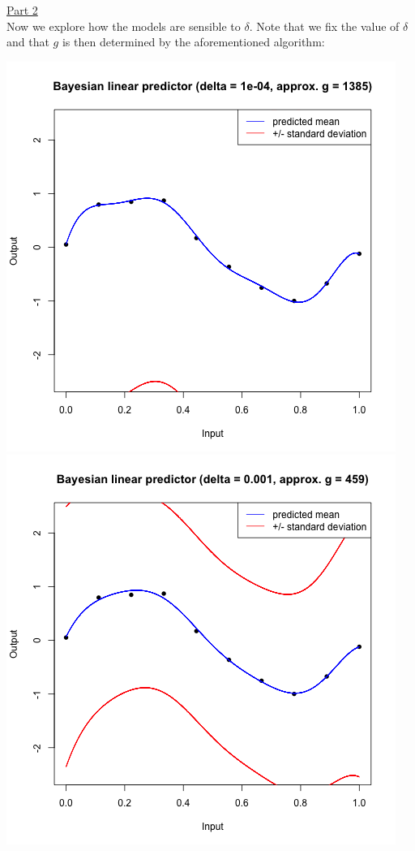 \documentclass[a4paper, 11pt]{article}
\begin{document}
\underline{Part 2}\\
\newline Now we explore how the models are sensible to $\delta$. Note that we fix the value of $\delta$ and that $g$ is then determined by the aforementioned algorithm:\\
\begin{center}
\includegraphics[scale=0.6]{ps3F_plot3_1.png}
\includegraphics[scale=0.6]{ps3F_plot3_2.png}

\end{center}
\end{document}
